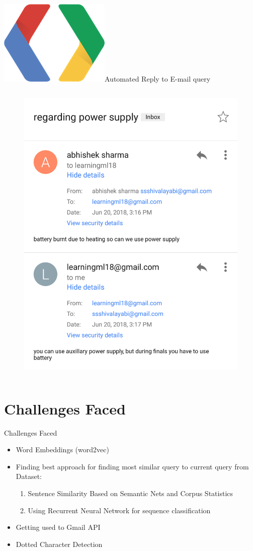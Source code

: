 \documentclass[10pt, a4paper]{beamer}
\newcommand\tabhalf[1][0.5cm]{\hspace*{#1}}
\begin{document}
\begin{frame}{\includegraphics[width=0.07 \textwidth, right=0.6cm]{google-developers-logo.png}\tabhalf Automated Reply to E-mail query}
\begin{columns}
\begin{figure}
 	    \includegraphics[height=0.8 \textheight]{reply2.png}
	\end{figure}
\end{columns}
\end{frame}


\section{Challenges Faced}
\begin{frame}{Challenges Faced}
	\begin{itemize}
    	\item Word Embeddings (word2vec)
    	\item Finding best approach for finding most similar query to current query from Dataset:
          \begin{enumerate}
          \item Sentence Similarity Based on Semantic Nets
and Corpus Statistics
          \item Using Recurrent Neural Network for sequence classification
          \end{enumerate}
        \item Getting used to Gmail API
        \item Dotted Character Detection
	\end{itemize}
\end{frame}
\end{document}
